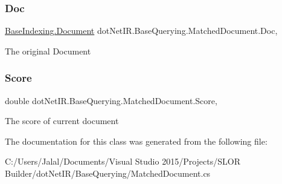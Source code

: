 \subsubsection{\texorpdfstring{Doc}{Doc}}
{\footnotesize\ttfamily \hyperlink{classdot_net_i_r_1_1_base_indexing_1_1_document}{Base\+Indexing.\+Document} dot\+Net\+I\+R.\+Base\+Querying.\+Matched\+Document.\+Doc\hspace{0.3cm}{\ttfamily [get]}, {\ttfamily [set]}}



The original Document 

\hypertarget{classdot_net_i_r_1_1_base_querying_1_1_matched_document_ab0c583848eaf13cb7a5d7c7ceb690e80}{}\label{classdot_net_i_r_1_1_base_querying_1_1_matched_document_ab0c583848eaf13cb7a5d7c7ceb690e80} 
\subsubsection{\texorpdfstring{Score}{Score}}
{\footnotesize\ttfamily double dot\+Net\+I\+R.\+Base\+Querying.\+Matched\+Document.\+Score\hspace{0.3cm}{\ttfamily [get]}, {\ttfamily [set]}}



The score of current document 



The documentation for this class was generated from the following file\+:\begin{DoxyCompactItemize}
\item 
C\+:/\+Users/\+Jalal/\+Documents/\+Visual Studio 2015/\+Projects/\+S\+L\+O\+R Builder/dot\+Net\+I\+R/\+Base\+Querying/Matched\+Document.\+cs\end{DoxyCompactItemize}
